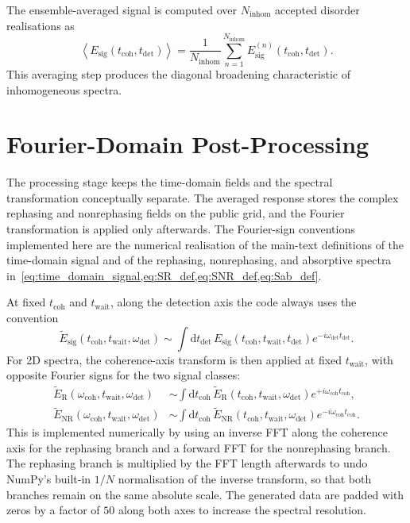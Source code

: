 The ensemble-averaged signal is computed over \(N_{\mathrm{inhom}}\) accepted
disorder realisations as
\begin{equation*}
\left\langle E_{\mathrm{sig}}(t_{\mathrm{coh}},t_{\mathrm{det}})\right\rangle
=
\frac{1}{N_{\mathrm{inhom}}}
\sum_{n=1}^{N_{\mathrm{inhom}}}
E_{\mathrm{sig}}^{(n)}(t_{\mathrm{coh}},t_{\mathrm{det}}).
\end{equation*}
This averaging step produces the diagonal broadening characteristic of
inhomogeneous spectra.

\section{Fourier-Domain Post-Processing}
\label{app:sec:post_processing}

The processing stage keeps the time-domain fields and the spectral
transformation conceptually separate. The averaged response stores the complex
rephasing and nonrephasing fields on the public grid, and the Fourier
transformation is applied only afterwards. The Fourier-sign conventions
implemented here are the numerical realisation of the main-text definitions of
the time-domain signal and of the rephasing, nonrephasing, and absorptive
spectra in~\cref{eq:time_domain_signal,eq:SR_def,eq:SNR_def,eq:Sab_def}.

At fixed \(t_{\mathrm{coh}}\) and \(t_{\mathrm{wait}}\), along the detection axis the code always uses the convention
\begin{equation*}
\tilde{E}_{\mathrm{sig}}(t_{\mathrm{coh}},t_{\mathrm{wait}},\omega_{\mathrm{det}})
\sim
\int \mathrm{d}t_{\mathrm{det}}\,
E_{\mathrm{sig}}(t_{\mathrm{coh}},t_{\mathrm{wait}},t_{\mathrm{det}})
e^{-i\omega_{\mathrm{det}} t_{\mathrm{det}}}.
\end{equation*}
For 2D spectra, the coherence-axis transform is then applied at fixed \(t_{\mathrm{wait}}\), with opposite Fourier signs for the two signal classes:
\begin{align*}
\tilde{E}_{\mathrm{R}}(\omega_{\mathrm{coh}},t_{\mathrm{wait}},\omega_{\mathrm{det}})
&\sim
\int \mathrm{d}t_{\mathrm{coh}}\,
\tilde{E}_{\mathrm{R}}(t_{\mathrm{coh}},t_{\mathrm{wait}},\omega_{\mathrm{det}})
e^{+i\omega_{\mathrm{coh}} t_{\mathrm{coh}}},
\\
\tilde{E}_{\mathrm{NR}}(\omega_{\mathrm{coh}},t_{\mathrm{wait}},\omega_{\mathrm{det}})
&\sim
\int \mathrm{d}t_{\mathrm{coh}}\,
\tilde{E}_{\mathrm{NR}}(t_{\mathrm{coh}},t_{\mathrm{wait}},\omega_{\mathrm{det}})
e^{-i\omega_{\mathrm{coh}} t_{\mathrm{coh}}}.
\end{align*}
This is implemented numerically by using an inverse FFT along the coherence axis for the rephasing branch and a forward FFT for the nonrephasing branch. The rephasing branch is multiplied by the FFT length afterwards to undo NumPy's built-in $1/N$ normalisation of the inverse transform, so that both branches remain on the same absolute scale.
The generated data are padded with zeros by a factor of $50$ along both axes to increase the spectral resolution.
